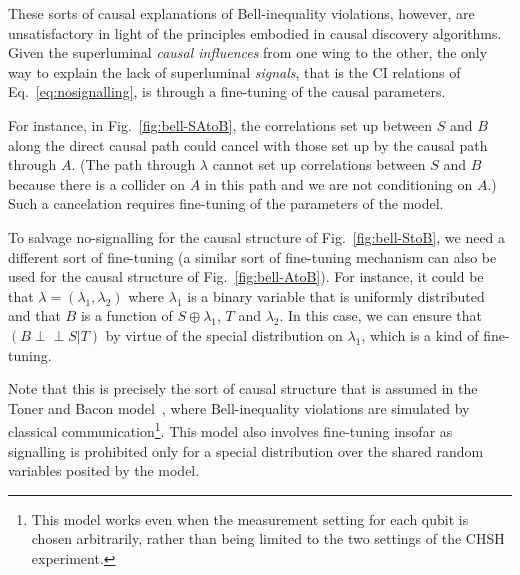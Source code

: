 \documentclass[letterpaper,onecolumn,nofootinbib]{revtex4}
\def\indep{\perp\!\!\!\!\perp}
\begin{document}
 These sorts of causal explanations of Bell-inequality violations, however, are unsatisfactory in light of the principles embodied in causal discovery algorithms.  Given the superluminal \emph{causal influences} from one wing to the other, the only way to explain the lack of superluminal \emph{signals}, that is the CI relations of Eq.~\eqref{eq:nosignalling}, is through a fine-tuning of the causal parameters.\color{black}
 

For instance, in Fig.~\ref{fig:bell-SAtoB}, the correlations set up between $S$ and $B$ along the direct causal path could cancel with those set up by the causal path through $A$. (The path through $\lambda$ cannot set up correlations between $S$ and $B$ because there is a collider on $A$ in this path and we are not conditioning on $A$.) Such a cancelation requires fine-tuning of the parameters of the model.

To salvage no-signalling for the causal structure of Fig.~\ref{fig:bell-StoB}, we need a different sort of fine-tuning (a similar sort of fine-tuning mechanism can also be used for the causal structure of Fig.~\ref{fig:bell-AtoB}).  For instance, it could be that $\lambda=(\lambda_1,\lambda_2)$ where $\lambda_1$ is a binary variable that is uniformly distributed and that $B$ is a function of $S\oplus \lambda_1$, $T$ and $\lambda_2$. In this case, we can ensure that $(B \indep S|T)$ by virtue of the special distribution on $\lambda_1$, which is a kind of fine-tuning.

Note that this is precisely the sort of causal structure that is assumed in the Toner and Bacon model~\cite{TonerBacon2003}, where Bell-inequality violations are simulated by classical communication\footnote{This model works even when the measurement setting for each qubit is chosen arbitrarily, rather than being limited to the two settings of the CHSH experiment.}. This model also involves fine-tuning insofar as signalling is prohibited only for a special distribution over the shared random variables posited by the model.
\end{document}
